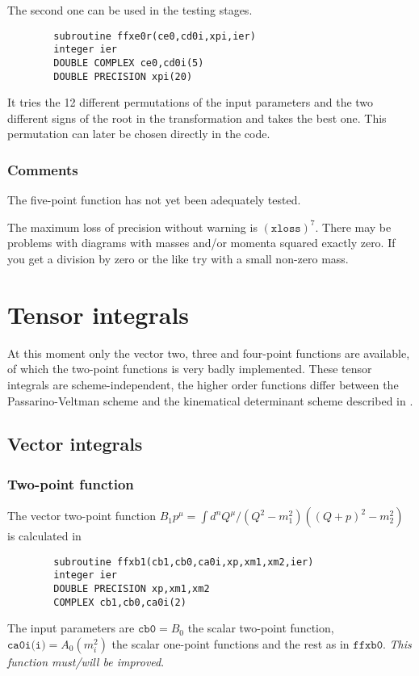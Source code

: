 \documentclass[twoside,12pt]{report}
\def\Code#1{\ensuremath{\texttt{#1}}}
\begin{document}
\begin{appendix}
The second one can be used in the testing stages.  
\begin{verbatim}
        subroutine ffxe0r(ce0,cd0i,xpi,ier)
        integer ier
        DOUBLE COMPLEX ce0,cd0i(5)
        DOUBLE PRECISION xpi(20)
\end{verbatim}
It tries the 12 different permutations of the input parameters and the two 
different signs of the root in the transformation and takes the best one.  
This permutation can later be chosen directly in the code.

\subsubsection{Comments}

The five-point function has not yet been adequately tested.

The maximum loss of precision without warning is $(\Code{xloss})^7$.  
There may be problems with diagrams with masses and/or momenta squared 
exactly zero.  If you get a division by zero or the like try with a 
small non-zero mass.


\section{Tensor integrals}

At this moment only the vector two, three and four-point functions are 
available, of which the two-point functions is very badly implemented.  These 
tensor integrals are scheme-independent, the higher order functions differ 
between the Passarino-Veltman scheme \cite{PaV79} and the 
kinematical determinant scheme described in \cite{vOV90}.

\subsection{Vector integrals}

\subsubsection{Two-point function}

The vector two-point function $B_1 p^\mu = \int d^n 
Q^\mu/(Q^2-m_1^2)((Q+p)^2-m_2^2)$ is calculated in
\begin{verbatim}
        subroutine ffxb1(cb1,cb0,ca0i,xp,xm1,xm2,ier)
        integer ier
        DOUBLE PRECISION xp,xm1,xm2
        COMPLEX cb1,cb0,ca0i(2)
\end{verbatim}
The input parameters are $\Code{cb0} = B_0$ the scalar two-point function, 
$\Code{ca0i(i)} = A_0(m_i^2)$ the scalar one-point functions and the rest 
as in \Code{ffxb0}.  {\em This function must/will be improved}.


\end{appendix}
\end{document}
